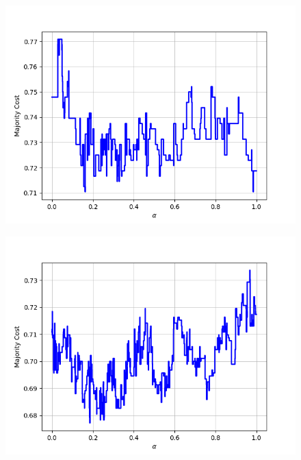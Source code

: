 \begin{figure}[H]
\begin{minipage}{.24\textwidth}
  {\includegraphics[width=\linewidth]{plots/omniglot-intra-ac-cnn/Asomtavruli_(Georgian)}}
\end{minipage}
\begin{minipage}{.24\textwidth}
  \centering
  {\includegraphics[width=\linewidth]{plots/omniglot-intra-ac-cnn/Balinese}}
\end{minipage}
\begin{minipage}{.24\textwidth}
  \centering

\end{minipage}
\end{figure}
